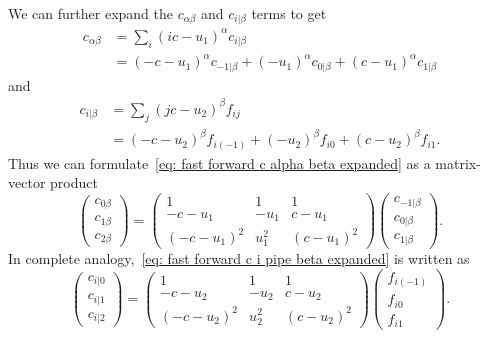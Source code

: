 We can further expand the $c_{\alpha\beta}$ and $c_{i|\beta}$ terms to get
\begin{equation}
  \begin{aligned}
    \label{eq: fast forward c alpha beta expanded}
    c_{\alpha\beta} & = \sum_{i} {\left(ic-u_1\right)}^\alpha c_{i|\beta} \\
    & = {\left(-c-u_1\right)}^\alpha c_{-1|\beta} + {\left(-u_1\right)}^\alpha c_{0|\beta} + {\left(c-u_1\right)}^\alpha c_{1|\beta}
  \end{aligned}
\end{equation}
and
\begin{equation}
  \begin{aligned}
    \label{eq: fast forward c i pipe beta expanded}
    c_{i|\beta} & = \sum_{j} {\left(jc-u_2\right)}^\beta f_{ij} \\
    & = {\left(-c-u_2\right)}^\beta f_{i(-1)} + {\left(-u_2\right)}^\beta f_{i0} + {\left(c-u_2\right)}^\beta f_{i1}.
  \end{aligned}
\end{equation}
Thus we can formulate~\eqref{eq: fast forward c alpha beta expanded} as a matrix-vector product
\begin{equation}
  \label{eq: fast forward c alpha beta matrix}
  \begin{pmatrix}
    c_{0\beta} \\
    c_{1\beta} \\
    c_{2\beta}
  \end{pmatrix}
  =
  \begin{pmatrix}
    1 & 1 & 1 \\
    -c-u_1 & - u_1 & c-u_1 \\
    {\left(-c - u_1\right)}^2 & u_1^2 & {\left(c- u_1\right)}^2
  \end{pmatrix}
  \begin{pmatrix}
    c_{-1|\beta} \\
    c_{0|\beta} \\
    c_{1|\beta}
  \end{pmatrix}.
\end{equation}
In complete analogy,~\eqref{eq: fast forward c i pipe beta expanded} is written as
\begin{equation}
  \label{eq:fast forward c i pipe beta matrix}
  \begin{pmatrix}
    c_{i|0} \\
    c_{i|1} \\
    c_{i|2}
  \end{pmatrix}
  =
  \begin{pmatrix}
    1 & 1 & 1 \\
    -c- u_2 & -  u_2 &   c- u_2 \\
    {\left(-c- u_2\right)}^2 & u_2^2 &  {\left(c- u_2\right)}^2
  \end{pmatrix}
  \begin{pmatrix}
    f_{i(-1)} \\
    f_{i0} \\
    f_{i1}
  \end{pmatrix}.
\end{equation}

